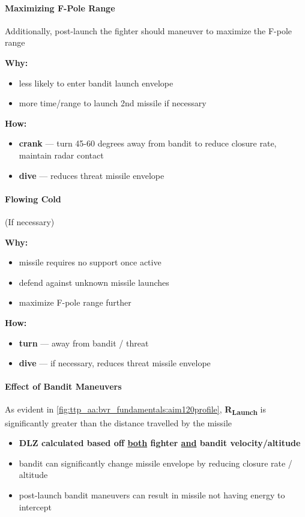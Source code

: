 \paragraph{Maximizing F-Pole Range} 
Additionally, post-launch the fighter should maneuver to maximize the F-pole range

\textbf{Why:}
\begin{itemize}
    \item less likely to enter bandit launch envelope
    \item more time/range to launch 2nd missile if necessary
\end{itemize}

\textbf{How:}
\begin{itemize}
    \item \textbf{crank} --- turn 45-60 degrees away from bandit to reduce closure rate, maintain radar contact
    \item \textbf{dive} --- reduces threat missile envelope
\end{itemize}

\paragraph{Flowing Cold} (If necessary)

\textbf{Why:}
\begin{itemize}
    \item missile requires no support once active
    \item defend against unknown missile launches
    \item maximize F-pole range further
\end{itemize}
\textbf{How:}
\begin{itemize}
    \item \textbf{turn} --- away from bandit / threat
    \item \textbf{dive} --- if necessary, reduces threat missile envelope 
\end{itemize}
\paragraph{Effect of Bandit Maneuvers}
As evident in \cref{fig:ttp_aa:bvr_fundamentals:aim120profile}, 
\textbf{R\textsubscript{Launch}} is significantly greater than the distance travelled by the missile
\begin{itemize}
    \item \textbf{DLZ calculated based off \underline{both} fighter \underline{and} bandit velocity/altitude}
    \item bandit can significantly change missile envelope by reducing closure rate / altitude
    \item post-launch bandit maneuvers can result in missile not having energy to intercept
\end{itemize}

